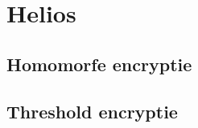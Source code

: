 % 
%

\chapter{Helios}
\label{chap:helios}



\section{Homomorfe encryptie}

\section{Threshold encryptie}
